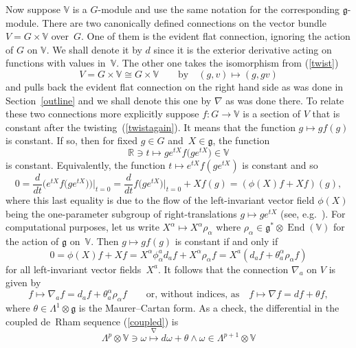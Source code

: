\documentclass[11pt]{article}
\newcommand{\End}{\operatorname{End}}
\begin{document}
Now suppose ${\mathbb{V}}$ is a $G$-module and use the same notation for the
corresponding ${\mathfrak{g}}$-module. There are two canonically def\/ined
connections on the vector bundle $V=G\times{\mathbb{V}}$ over~$G$. One of them
is the evident f\/lat connection, ignoring the action of $G$ on ${\mathbb{V}}$.
We shall denote it by $d$ since it is the exterior derivative acting on
functions with values in~${\mathbb{V}}$. The other one takes the isomorphism
from (\ref{twist})
\begin{equation}\label{twistagain}
V=G\times{\mathbb{V}}\cong G\times{\mathbb{V}}\qquad\mbox{by}\quad
(g,v)\mapsto(g,gv)\end{equation}
and pulls back the evident f\/lat connection on the right hand side as was done
in Section~\ref{outline} and we shall denote this one by $\nabla$ as was done there.
To relate these two connections more explicitly suppose $f:G\to{\mathbb{V}}$ is
a section of $V$ that is constant after the twisting~(\ref{twistagain}). It
means that the function $g\mapsto gf(g)$ is constant. If so, then for f\/ixed
$g\in G$ and~$X\in{\mathfrak{g}}$, the function
\[{\mathbb{R}}\ni t\mapsto ge^{tX}f\big(ge^{tX}\big)\in{\mathbb{V}}\]
is constant. Equivalently, the function $t\mapsto e^{tX}f(ge^{tX})$ is
constant and so
\[0=\frac{d}{dt}\big(e^{tX}f\big(ge^{tX}\big)\big)\Big|_{t=0}
=\frac{d}{dt}f\big(ge^{tX}\big)\big|_{t=0}+Xf(g)=(\phi(X)f+Xf)(g),\]
where this last equality is due to the f\/low of the left-invariant vector f\/ield
$\phi(X)$ being the one-parameter subgroup of right-translations
$g\mapsto ge^{tX}$ (see, e.g.~\cite{w}). For computational purposes, let us
write $X^\alpha\mapsto X^\alpha\rho_\alpha$ where
$\rho_\alpha\in{\mathfrak{g}}^*\otimes\End({\mathbb{V}})$ for the action of
${\mathfrak{g}}$ on~${\mathbb{V}}$. Then $g\mapsto gf(g)$ is constant if and
only if
\[0=\phi(X)f+Xf=X^\alpha\phi_\alpha^ad_af+X^\alpha\rho_\alpha f
=X^a(d_af+\theta_a^\alpha\rho_\alpha f)\]
for all left-invariant vector f\/ields~$X^a$. It follows that the connection
$\nabla_a$ on $V$ is given by
\begin{equation}\label{nabla}
f\mapsto\nabla_af=d_af+\theta_a^\alpha\rho_\alpha f\qquad
\mbox{or, without indices, as}\quad
f\mapsto\nabla f=df+\theta f,\end{equation}
where $\theta\in\Lambda^1\otimes{\mathfrak{g}}$ is the Maurer--Cartan form. As a
check, the dif\/ferential in the coupled de~Rham sequence (\ref{coupled}) is
\[\Lambda^p\otimes{\mathbb{V}}\ni\omega\stackrel{\nabla}{\longmapsto}
d\omega+\theta\wedge\omega
\in\Lambda^{p+1}\otimes{\mathbb{V}}\]
\end{document}
